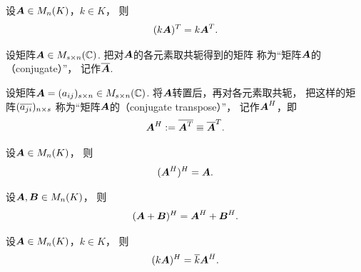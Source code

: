 \begin{property}\label{theorem:矩阵的转置.性质3}
设\(\boldsymbol{A} \in M_n(K)\)，\(k \in K\)，
则\begin{equation}
	(k \boldsymbol{A})^T = k \boldsymbol{A}^T.
\end{equation}
\end{property}

\begin{definition}
设矩阵\(\boldsymbol{A} \in M_{s \times n}(\mathbb{C})\).
把对\(\boldsymbol{A}\)的各元素取共轭得到的矩阵
称为“矩阵\(\boldsymbol{A}\)的（conjugate）”，
记作\(\overline{\boldsymbol{A}}\).
\end{definition}

\begin{definition}
设矩阵\(\boldsymbol{A} = (a_{ij})_{s \times n} \in M_{s \times n}(\mathbb{C})\).
将\(\boldsymbol{A}\)转置后，再对各元素取共轭，
把这样的矩阵\((\overline{a_{ji}})_{n \times s}\)
称为“矩阵\(\boldsymbol{A}\)的（conjugate transpose）”，
记作\(\boldsymbol{A}^H\)，即\begin{equation*}
    \boldsymbol{A}^H := \overline{\boldsymbol{A}^T} \equiv \overline{\boldsymbol{A}}^T.
\end{equation*}
\end{definition}

\begin{property}\label{theorem:矩阵的共轭转置.性质1}
设\(\boldsymbol{A} \in M_n(K)\)，
则\begin{equation}
	(\boldsymbol{A}^H)^H = \boldsymbol{A}.
\end{equation}
\end{property}

\begin{property}\label{theorem:矩阵的共轭转置.性质2}
设\(\boldsymbol{A},\boldsymbol{B} \in M_n(K)\)，
则\begin{equation}
	(\boldsymbol{A} + \boldsymbol{B})^H = \boldsymbol{A}^H + \boldsymbol{B}^H.
\end{equation}
\end{property}

\begin{property}\label{theorem:矩阵的共轭转置.性质3}
设\(\boldsymbol{A} \in M_n(K)\)，\(k \in K\)，
则\begin{equation}
	(k \boldsymbol{A})^H = \overline{k} \boldsymbol{A}^H.
\end{equation}
\end{property}

